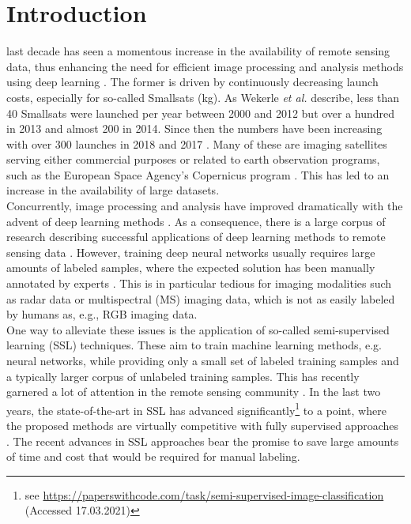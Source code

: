 \documentclass[journal]{IEEEtran}
\newcommand{\etal}{\textit{et al.}}
\begin{document}
\begingroup\renewcommand\thefootnote{*}
\endgroup

\IEEEpeerreviewmaketitle

\section{Introduction}
 last decade has seen a momentous increase in the availability of remote sensing data, thus enhancing the need for efficient image processing and analysis methods using deep learning \cite{zhu2017}. The former is driven by continuously decreasing launch costs, especially for so-called Smallsats (kg). As Wekerle \etal{} \cite{wekerle2017} describe, less than 40 Smallsats were launched per year between 2000 and 2012 but over a hundred in 2013 and almost 200 in 2014. Since then the numbers have been increasing with over 300 launches in 2018 and 2017 \cite{puteaux2019}. Many of these are imaging satellites serving either commercial purposes \cite{popkin2017} or related to earth observation programs, such as the European Space Agency's Copernicus program \cite{aschbacher2017,wekerle2017}. This has led to an increase in the availability of large datasets. \\
Concurrently, image processing and analysis have improved dramatically with the advent of deep learning methods \cite{alom2018}. As a consequence, there is a large corpus of research describing successful applications of deep learning methods to remote sensing data \cite{ball2017,chen2016,ma2019,zhang2016,zhu2017}. However, training deep neural networks usually requires large amounts of labeled samples, where the expected solution has been manually annotated by experts \cite{chen2017hyperspectral}. This is in particular tedious for imaging modalities such as radar data or multispectral (MS) imaging data, which is not as easily labeled by humans as, e.g., RGB imaging data. \\
One way to alleviate these issues is the application of so-called semi-supervised learning (SSL) techniques. These aim to train machine learning methods, e.g. neural networks, while providing only a small set of labeled training samples and a typically larger corpus of unlabeled training samples. This has recently garnered a lot of attention in the remote sensing community \cite{liu2017,wu2017,zhang2020,roy2018,tao2020}. In the last two years, the state-of-the-art in SSL has advanced significantly\footnote{see \url{ https://paperswithcode.com/task/semi-supervised-image-classification} (Accessed 17.03.2021)} to a point, where the proposed methods are virtually competitive with fully supervised approaches \cite{berthelot2019,berthelot2019remixmatch,kurakin2020}. The recent advances in SSL approaches bear the promise to save large amounts of time and cost that would be required for manual labeling. \\
\end{document}
